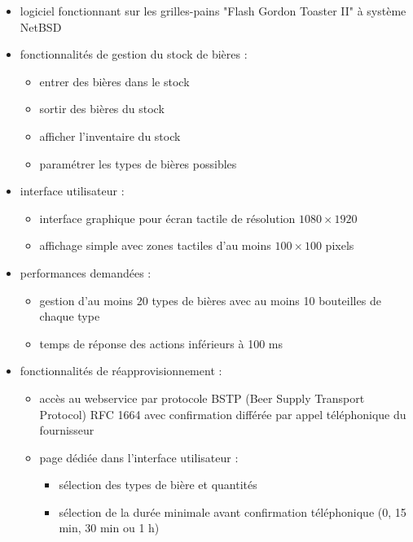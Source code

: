 \documentclass[a4paper,oneside]{article}
\begin{document}
\begin{itemize}
    \item logiciel fonctionnant sur les grilles-pains "Flash Gordon Toaster II" à système NetBSD
    \item fonctionnalités de gestion du stock de bières :
        \begin{itemize}
            \item entrer des bières dans le stock
            \item sortir des bières du stock
            \item afficher l'inventaire du stock 
            \item paramétrer les types de bières possibles
        \end{itemize}
    \item interface utilisateur :
        \begin{itemize}
            \item interface graphique pour écran tactile de résolution $1080 \times 1920$
            \item affichage simple avec zones tactiles d'au moins $100 \times 100$ pixels
        \end{itemize}
    \item performances demandées :
        \begin{itemize}
            \item gestion d'au moins 20 types de bières avec au moins 10 bouteilles de chaque type
            \item temps de réponse des actions inférieurs à 100 ms 
        \end{itemize}
    \item fonctionnalités de réapprovisionnement :
        \begin{itemize}
            \item accès au webservice par protocole BSTP (Beer Supply Transport Protocol) RFC 1664 avec confirmation différée par appel téléphonique du fournisseur
            \item page dédiée dans l'interface utilisateur : 
                \begin{itemize}
                    \item sélection des types de bière et quantités 
                    \item sélection de la durée minimale avant confirmation téléphonique (0, 15 min, 30 min ou 1 h)
                \end{itemize}
        \end{itemize}
\end{itemize}
\end{document}
